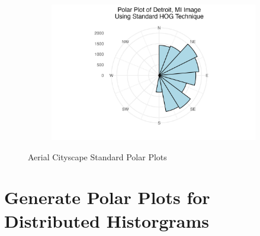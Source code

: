 \documentclass[
  letterpaper,
  DIV=11,
  numbers=noendperiod]{scrreprt}
\begin{document}
\begin{figure}
\begin{minipage}{0.33\linewidth}
\begin{figure}[H]
{}


\end{figure}%

\end{minipage}%
%
\begin{minipage}{0.33\linewidth}

\begin{figure}[H]

{\centering \includegraphics{images/plots/aerial_cities/detroit_standard_polar_plot.jpg}

}


\end{figure}%

\end{minipage}%

\caption{\label{fig-city-standard-polar}Aerial Cityscape Standard Polar
Plots}

\end{figure}%

\section{Generate Polar Plots for Distributed
Historgrams}\label{generate-polar-plots-for-distributed-historgrams}
\end{document}
